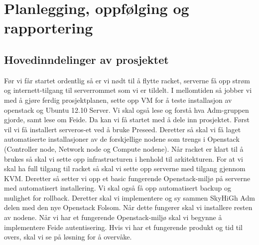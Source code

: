 \documentclass[12pt,a4paper]{article}
\begin{document}
\section{Planlegging, oppfølging og rapportering}
\subsection{Hovedinndelinger av prosjektet}
Før vi får startet ordentlig så er vi nødt til å flytte racket, serverne få opp strøm og internett-tilgang til serverrommet som vi er tildelt. I mellomtiden så jobber vi med å gjøre ferdig prosjektplanen, sette opp VM for å teste installasjon av openstack og Ubuntu 12.10 Server. Vi skal også lese og forstå hva Adm-gruppen gjorde, samt lese om Feide. \newline \newline
Da kan vi få startet med å dele inn prosjektet. Først vil vi få installert serveros-et ved å bruke Preseed. Deretter så skal vi få laget automatiserte installasjoner av de forskjellige nodene som trengs i Openstack (Controller node, Network node og Compute nodene). \newline \newline
Når racket er klart til å brukes så skal vi sette opp infrastructuren i henhold til arkitekturen. For at vi skal ha full tilgang til racket så skal vi sette opp serverne med tilgang gjennom KVM. \newline \newline
Deretter så setter vi opp et basic fungerende Openstack-miljø på serverne med automatisert installering. Vi skal også få opp automatisert backup og mulighet for rollback. Deretter skal vi implementere og sy sammen SkyHiGh Adm delen med den nye Openstack Folsom. Når dette fungerer skal vi installere resten av nodene. \newline \newline
Når vi har et fungerende Openstack-miljø skal vi begynne å implementere Feide autentisering. Hvis vi har et fungerende produkt og tid til overs, skal vi se på løsning for å overvåke.
\end{document}
